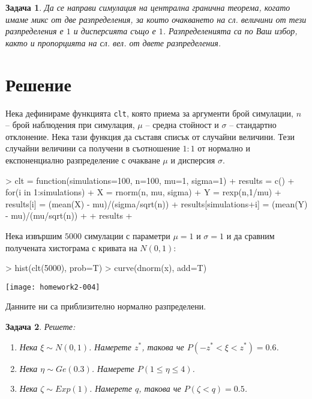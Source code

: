 \documentclass{report}
\newtheorem{pr}{Задача}
\newcommand\sol{\section*{Решение} }
\begin{document}
\begin{pr}
  Да се направи симулация на централна гранична теорема, когато имаме микс от
  две разпределения, за които очакването на сл. величини от тези разпределения е
  $1$ и дисперсията също е $1$. Разпределенията са по Ваш избор, както и
  пропорцията на сл. вел. от двете разпределения.
\end{pr}

\sol
Нека дефинираме функцията \texttt{clt}, която приема за аргументи брой
симулации, $n$ – брой наблюдения при симулация, $\mu$ – средна стойност и
$\sigma$ – стандартно отклонение. Нека тази функция да съставя списък от
случайни величини. Тези случайни величини са получени в съотношение $1:1$ от
нормално и експоненциално разпределение с очакване $\mu$ и дисперсия $\sigma$.

\begin{Schunk}
\begin{Sinput}
> clt = function(simulations=100, n=100, mu=1, sigma=1) {
+   results = c()
+   for(i in 1:simulations) {
+     X = rnorm(n, mu, sigma)
+     Y = rexp(n,1/mu)
+     results[i] = (mean(X) - mu)/(sigma/sqrt(n))
+     results[simulations+i] = (mean(Y) - mu)/(mu/sqrt(n))
+   }
+   results
+ }
\end{Sinput}
\end{Schunk}

Нека извършим $5000$ симулации с параметри $\mu = 1$ и $\sigma = 1$ и да сравним получената хистограма с кривата на $N(0, 1)$:
\begin{center}
\begin{Schunk}
\begin{Sinput}
> hist(clt(5000), prob=T)
> curve(dnorm(x), add=T)
\end{Sinput}
\end{Schunk}
\texttt{[image: homework2-004]}
\end{center}
Данните ни са приблизително нормално разпределени.

\begin{pr}\label{pr:3}
  Решете:

  \begin{enumerate}[label=(\alph*)]
  \item Нека $\xi \sim N(0,1)$. Намерете $z^\ast$, такова че $P(-z^\ast < \xi <
    z^\ast) = 0.6$.
  \item Нека $\eta \sim Ge(0.3)$. Намерете $P(1 \leq \eta \leq 4)$.
  \item Нека $\zeta \sim Exp(1)$. Намерете $q$, такова че $P(\zeta <
    q) = 0.5$.
  \end{enumerate}
\end{pr}
\end{document}
